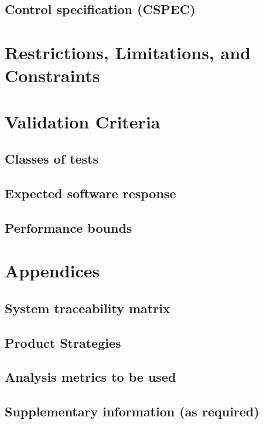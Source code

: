\documentclass{article}
\begin{document}
\subsection{Control specification (CSPEC)}

\section{Restrictions, Limitations, and Constraints}

\section{Validation Criteria}

\subsection{Classes of tests}

\subsection{Expected software response}

\subsection{Performance bounds}

\section{Appendices}

\subsection{System traceability matrix}

\subsection{Product Strategies}

\subsection{Analysis metrics to be used}

\subsection{Supplementary information (as required)}
\end{document}
